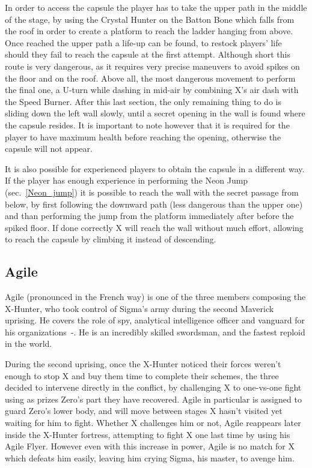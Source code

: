 In order to access the capsule the player has to take the upper path in the middle of the stage, by using the Crystal Hunter  on the Batton Bone which falls from the roof in order to create a platform to reach the ladder hanging from above. Once reached the upper path a life-up can be found, to restock players' life should they fail to reach the capsule at the first attempt. Although short this route is very dangerous, as it requires very precise maneuvers to avoid spikes on the floor and on the roof. Above all, the most dangerous movement to perform the final one, a U-turn while dashing in mid-air by combining X's air dash with the Speed Burner. After this last section, the only remaining thing to do is sliding down the left wall slowly, until a secret opening in the wall is found where the capsule resides. It is important to note however that it is required for the player to have maximum health before reaching the opening, otherwise the capsule will not appear.

It is also possible for experienced players to obtain the capsule in a different way. If the player has enough experience in performing the Neon Jump (sec.~\ref{Neon_jump}) it is possible to reach the wall with the secret passage from below, by first following the downward path (less dangerous than the upper one) and than performing the jump from the platform immediately after before the spiked floor. If done correctly X will reach the wall without much effort, allowing to reach the capsule by climbing it instead of descending.

\subsection{Agile}\label{boss:Agile}
Agile (pronounced in the French way) is one of the three members composing the X-Hunter, who took control of Sigma's army during the second Maverick uprising. He covers the role of spy, analytical intelligence officer and vanguard for his organizations~\cite{MHX:manual}-\cite{wayback:X2_resources}. He is an incredibly skilled swordsman, and the fastest reploid in the world. 

During the second uprising, once the X-Hunter noticed their forces weren't enough to stop X and buy them time to complete their schemes, the three decided to intervene directly in the conflict, by challenging X to one-vs-one fight using as prizes Zero's part they have recovered. Agile in particular is assigned to guard Zero's lower body, and will move between stages X hasn't visited yet waiting for him to fight. Whether X challenges him or not, Agile reappears later inside the X-Hunter fortress, attempting to fight X one last time by using his Agile Flyer. However even with this increase in power, Agile is no match for X which defeats him easily, leaving him crying Sigma, his master, to avenge him.

